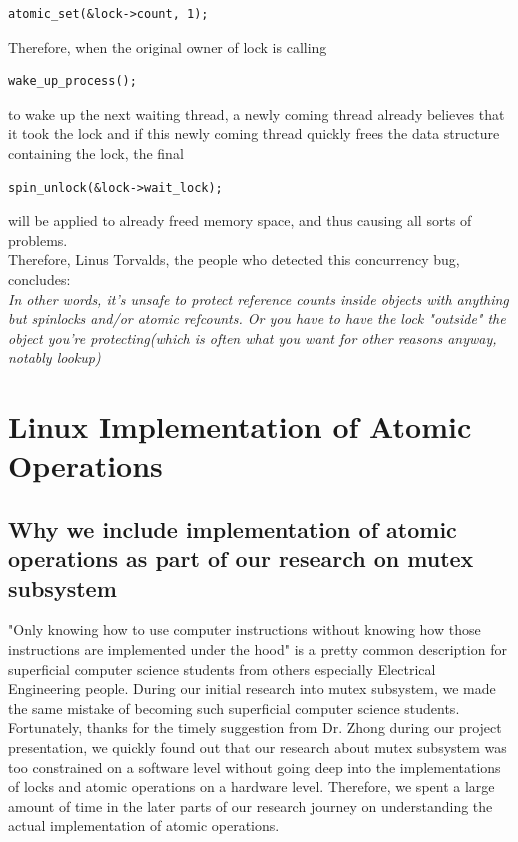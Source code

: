 \documentclass[10pt]{sigplanconf}
\begin{document}
\begin{lstlisting}
atomic_set(&lock->count, 1);
\end{lstlisting}
Therefore, when the original owner of lock is calling 
\begin{lstlisting}
wake_up_process(); 
\end{lstlisting}
to wake up the next waiting thread, a newly coming thread already believes that it took the lock and if this newly coming thread quickly frees the data structure containing the lock, the final 
\begin{lstlisting}
spin_unlock(&lock->wait_lock);
\end{lstlisting}
will be applied to already freed memory space, and thus causing all sorts of problems. \\
Therefore, Linus Torvalds, the people who detected this concurrency bug, concludes:\\

\textit{In other words, it's unsafe to protect reference counts inside objects with anything but spinlocks and/or atomic refcounts. Or you have to have the lock "outside" the object you're protecting(which is often what you want for other reasons anyway, notably lookup)}\\

\vspace{50pt}

\section{Linux Implementation of Atomic Operations}
\subsection{Why we include implementation of atomic operations as part of our research on mutex subsystem}
"Only knowing how to use computer instructions without knowing how those instructions are implemented under the hood" is a pretty common description for superficial computer science students from others especially Electrical Engineering people. During our initial research into mutex subsystem, we made the same mistake of becoming such superficial computer science students. \\
Fortunately, thanks for the timely suggestion from Dr. Zhong during our project presentation, we quickly found out that our research about mutex subsystem was too constrained on a software level without going deep into the implementations of locks and atomic operations on a hardware level. Therefore, we spent a large amount of time in the later parts of our research journey on understanding the actual implementation of atomic operations.
\end{document}
